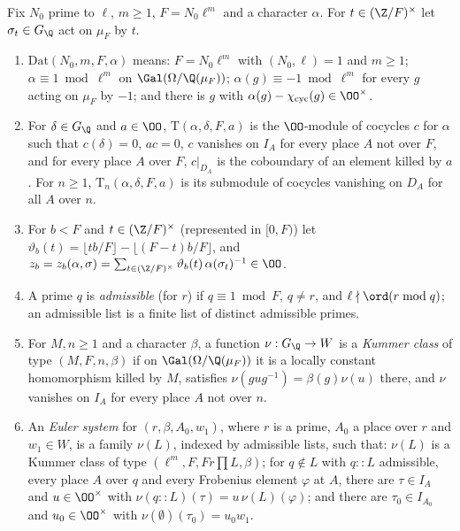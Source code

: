 Fix $N_0$ prime to $\ell$, $m\ge1$, $F=N_0\ell^m$ and a character $\alpha$. For $t\in(\Z/F)^\times$ let $\sigma_t\in G_\Q$ act on $\mu_F$ by $t$.

\begin{definition}\label{pf:vwin:mldefs}
\begin{enumerate}[label=(\alph*)]
\item $\mathrm{Dat}(N_0,m,F,\alpha)$ means: $F=N_0\ell^m$ with $(N_0,\ell)=1$ and $m\ge1$; $\alpha\equiv1\bmod\ell^m$ on
$\Gal(\Omega/\Q(\mu_F))$; $\alpha(g)\equiv-1\bmod\ell^m$ for every $g$ acting on $\mu_F$ by $-1$; and there is $g$ with
$\alpha(g)-\vwincyc(g)\in\OO^\times$.
\item For $\delta\in G_\Q$ and $a\in\OO$, $\mathrm{T}(\alpha,\delta,F,a)$ is the $\OO$-module of cocycles $c$ for $\alpha$ such that
$c(\delta)=0$, $ac=0$, $c$ vanishes on $I_A$ for every place $A$ not over $F$, and for every place $A$ over $F$, $c|_{D_A}$ is the coboundary of
an element killed by $a$. For $n\ge1$, $\mathrm{T}_n(\alpha,\delta,F,a)$ is its submodule of cocycles vanishing on $D_A$ for all $A$ over $n$.
\item For $b<F$ and $t\in(\Z/F)^\times$ (represented in $[0,F)$) let $\vartheta_b(t)=\lfloor tb/F\rfloor-\lfloor(F-t)b/F\rfloor$, and
$z_b=z_b(\alpha,\sigma)=\sum_{t\in(\Z/F)^\times}\vartheta_b(t)\,\alpha(\sigma_t)^{-1}\in\OO$.
\item A prime $q$ is \emph{admissible} (for $r$) if $q\equiv1\bmod F$, $q\ne r$, and $\ell\nmid\ord(r\bmod q)$; an admissible list is a
finite list of distinct admissible primes.
\item For $M,n\ge1$ and a character $\beta$, a function $\nu:G_\Q\to W$ is a \emph{Kummer class} of type $(M,F,n,\beta)$ if on
$\Gal(\Omega/\Q(\mu_F))$ it is a locally constant homomorphism killed by $M$, satisfies $\nu(gug^{-1})=\beta(g)\nu(u)$ there, and $\nu$
vanishes on $I_A$ for every place $A$ not over $n$.
\item An \emph{Euler system} for $(r,\beta,A_0,w_1)$, where $r$ is a prime, $A_0$ a place over $r$ and $w_1\in W$, is a family $\nu(L)$,
indexed by admissible lists, such that: $\nu(L)$ is a Kummer class of type $(\ell^m,F,Fr\prod L,\beta)$; for $q\notin L$ with $q::L$
admissible, every place $A$ over $q$ and every Frobenius element $\varphi$ at $A$, there are $\tau\in I_A$ and $u\in\OO^\times$ with
$\nu(q::L)(\tau)=u\,\nu(L)(\varphi)$; and there are $\tau_0\in I_{A_0}$ and $u_0\in\OO^\times$ with $\nu(\emptyset)(\tau_0)=u_0w_1$.
\end{enumerate}
\end{definition}

